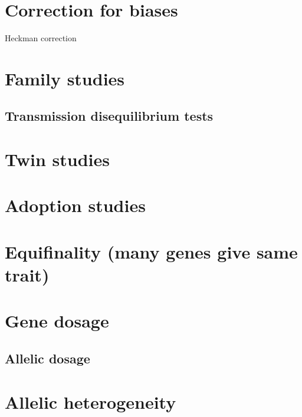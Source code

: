 \documentclass[
]{book}
\begin{document}
\hypertarget{correction-for-biases}{%
\section{Correction for biases}\label{correction-for-biases}}

Heckman correction

\hypertarget{family-studies}{%
\section{Family studies}\label{family-studies}}

\hypertarget{transmission-disequilibrium-tests}{%
\subsection{Transmission disequilibrium tests}\label{transmission-disequilibrium-tests}}

\hypertarget{twin-studies-1}{%
\section{Twin studies}\label{twin-studies-1}}

\hypertarget{adoption-studies}{%
\section{Adoption studies}\label{adoption-studies}}

\hypertarget{equifinality-many-genes-give-same-trait}{%
\section{Equifinality (many genes give same trait)}\label{equifinality-many-genes-give-same-trait}}

\hypertarget{gene-dosage}{%
\section{Gene dosage}\label{gene-dosage}}

\hypertarget{allelic-dosage}{%
\subsection{Allelic dosage}\label{allelic-dosage}}

\hypertarget{allelic-heterogeneity}{%
\section{Allelic heterogeneity}\label{allelic-heterogeneity}}
\end{document}
